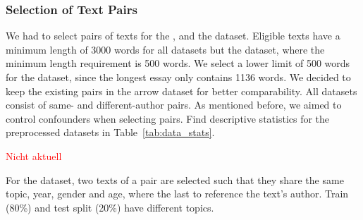 \subsubsection{Selection of Text Pairs}
\label{subsubsec:dataset_text_pair_selection}

We had to select pairs of texts for the \dataBlog{}, \dataStudent{} and the \dataGutenberg{} dataset.
Eligible texts have a minimum length of \num{3000} words for all datasets but the \dataStudent{} dataset, 
where the minimum length requirement is \num{500} words.
We select a lower limit of \num{500} words for the \dataStudent{} dataset, 
since the longest essay only contains \num{1136} words.
We decided to keep the existing pairs in the \dataPan{} arrow dataset for better comparability.
All datasets consist of same- and different-author pairs. 
As mentioned before, we aimed to control confounders when selecting pairs.
Find descriptive statistics for the preprocessed datasets in Table~\ref{tab:data_stats}.

\begin{table}[h]
\centering\small
\caption{Statistics of preprocessed datasets \dataPan{}, \dataBlog{}, \dataGutenberg{}, and \dataStudent{}.}
\label{tab:data_stats}
\end{table}
\textcolor{red}{Nicht aktuell}

For the \dataBlog{} dataset, 
two texts of a pair are selected such that they share the same topic, year, gender and age, where the last to reference the text's author.
Train (80\%) and test split (20\%) have different topics.

